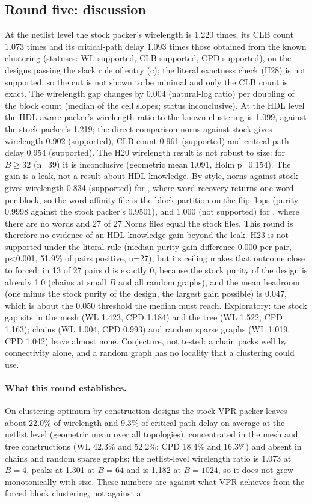 
\subsection{Round five: discussion}
\label{sec:r5-discussion}
At the netlist level the stock packer's wirelength is 1.220 times, its CLB count 1.073 times and its critical-path delay 1.093 times those obtained from the known clustering (statuses: WL supported, CLB supported, CPD supported), on the designs passing the slack rule of entry (c); the literal exactness check (H28) is not supported, so the cut is not shown to be minimal and only the CLB count is exact. The wirelength gap changes by 0.004 (natural-log ratio) per doubling of the block count (median of the cell slopes; status inconclusive). At the HDL level the HDL-aware packer's wirelength ratio to the known clustering is 1.099, against the stock packer's 1.219; the direct comparison norns against stock gives wirelength 0.902 (supported), CLB count 0.961 (supported) and critical-path delay 0.954 (supported). The H20 wirelength result is not robust to size: for $B\ge32$ (n=39) it is inconclusive (geometric mean 1.091, Holm p=0.154). The gain is a leak, not a result about HDL knowledge. By style, norns against stock gives wirelength 0.834 (supported) for , where word recovery returns one word per block, so the word affinity file is the block partition on the flip-flops (purity 0.9998 against the stock packer's 0.9501), and 1.000 (not supported) for , where there are no words and 27 of 27 Norns  files equal the stock files. This round is therefore no evidence of an HDL-knowledge gain beyond the leak. H23 is not supported under the literal rule (median purity-gain difference 0.000 per pair, p<0.001, 51.9\% of pairs positive, n=27), but its ceiling makes that outcome close to forced: in 13 of 27 pairs d is exactly 0, because the stock purity of the  design is already 1.0 (chains at small $B$ and all random graphs), and the mean headroom (one minus the stock purity of the  design, the largest gain possible) is 0.047, which is about the 0.050 threshold the median must reach. Exploratory: the stock gap sits in the mesh (WL 1.423, CPD 1.184) and the tree (WL 1.522, CPD 1.163); chains (WL 1.004, CPD 0.993) and random sparse graphs (WL 1.019, CPD 1.042) leave almost none. Conjecture, not tested: a chain packs well by connectivity alone, and a random graph has no locality that a clustering could use. \paragraph{What this round establishes.} On clustering-optimum-by-construction designs the stock VPR packer leaves about 22.0\% of wirelength and 9.3\% of critical-path delay on average at the netlist level (geometric mean over all topologies), concentrated in the mesh and tree constructions (WL 42.3\% and 52.2\%; CPD 18.4\% and 16.3\%) and absent in chains and random sparse graphs; the netlist-level wirelength ratio is 1.073 at $B=4$, peaks at 1.301 at $B=64$ and is 1.182 at $B=1024$, so it does not grow monotonically with size. These numbers are against what VPR achieves from the forced block clustering, not against a 